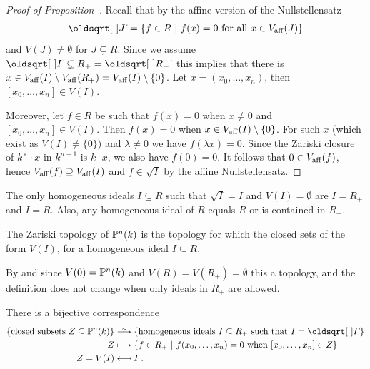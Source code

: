 \documentclass[a4paper,parskip=half,numbers=enddot, DIV=12]{scrreprt}
\begin{document}
\begin{proof}[Proof of Proposition~]
    Recall that by the affine version of the Nullstellensatz
    \begin{align*}
        \sqrt{J} = \left\{f\in R\st f(x) = 0 \text{ for all } x\in V_\aff(J)\right\}
    \end{align*}
    and $V(J)\neq \emptyset$ for $J\subsetneq R$. Since we assume $\sqrt{I}\subsetneq R_+ = \sqrt{R\smash{_+}}$ this implies that there is $x\in V_{\mathrm{aff}}(I)\setminus V_{\mathrm{aff}}(R_+) = V_{\mathrm{aff}}(I)\setminus\{0\}$. Let $x=(x_0,\ldots, x_n)$, then $[x_0,\ldots,x_n]\in V(I)$. 
    
    Moreover, let $f\in R$ be such that $f(x) = 0$ when $x\neq 0$ and $[x_0,\ldots, x_n]\in V(I)$. Then $f(x)=0$ when $x\in V_{\mathrm{aff}}(I)\setminus\{0\}$. For such $x$ (which exist as $V(I)\neq \{0\}$) and $\lambda\neq 0$ we have $f(\lambda x) = 0$. Since the Zariski closure of $k^\times \cdot x$ in $k^{n+1}$ is $k\cdot x$, we also have $f(0)=0$. It follows that $0\in V_{\mathrm{aff}}(f)$, hence $V_{\mathrm{aff}}(f)\supseteq V_{\mathrm{aff}}(I)$ and $f\in \sqrt{I}$ by the affine Nullstellensatz.
\end{proof}
\begin{rem*}
    The only homogeneous ideals $I\subseteq R$ such that $\sqrt{I}=I$ and $V(I)=\emptyset$ are $I=R_+$ and $I=R$. Also, any homogeneous ideal of $R$ equals $R$ or is contained in $R_+$.
\end{rem*}
\begin{defi}[Topology on $\IP^n(k)$]
    The Zariski topology of $\IP^n(k)$ is the topology for which the closed sets of the form $V(I)$, for a homogeneous ideal $I\subseteq R$.
\end{defi}
\begin{rem*}
    By  and since $V(0)= \mathbb{P}^n(k)$ and $V(R) = V(R_+) =\emptyset$ this a topology, and the definition does not change when only ideals in $R_+$ are allowed.
\end{rem*}
\begin{prop}
There is a bijective correspondence
\begin{align*}
\left\{\text{closed subsets }Z\subseteq\IP^n(k)\right\}&\isomorphism\left\{\text{homogeneous ideals }I\subseteq R_+\text{ such that }I=\sqrt{I}\right\}\\
Z &\longmapsto \left\{f\in R_+ \st f(x_0,\ldots,x_n) = 0\text{ when } [x_0,\ldots,x_n]\in Z\right\}\\
Z=V(I) &\longmapsfrom I\;.
\end{align*}
\end{prop}
\end{document}
